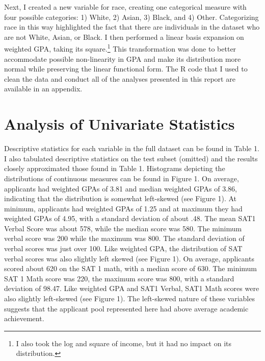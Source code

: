 \documentclass[titlepage]{article}   	%
\begin{document}
Next, I created a new variable for race, creating one categorical measure with four possible categories: 1) White, 2) Asian, 3) Black, and 4) Other. Categorizing race in this way highlighted the fact that there are individuals in the dataset who are not White, Asian, or Black. I then performed a linear basis expansion on weighted GPA, taking its square.\footnote{\label{myfootnote} I also took the log and square of income, but it had no impact on its distribution.} This transformation was done to better accommodate possible non-linearity in GPA and make its distribution more normal while preserving the linear functional form. The R code that I used to clean the data and conduct all of the analyses presented in this report are available in an appendix.

\section{Analysis of Univariate Statistics}

Descriptive statistics for each variable in the full dataset can be found in Table 1. I also tabulated descriptive statistics on the test subset (omitted) and the results closely approximated those found in Table 1. Histograms depicting the distributions of continuous measures can be found in Figure 1. On average, applicants had weighted GPAs of 3.81 and median weighted GPAs of 3.86, indicating that the distribution is somewhat left-skewed (see Figure 1). At minimum, applicants had weighted GPAs of 1.25 and at maximum they had weighted GPAs of 4.95, with a standard deviation of about .48.  The mean SAT1 Verbal Score was about 578, while the median score was 580. The minimum verbal score was 200 while the maximum was 800. The standard deviation of verbal scores was just over 100. Like weighted GPA, the distribution of SAT verbal scores was also slightly left skewed (see Figure 1). On average, applicants scored about 620 on the SAT 1 math, with a median score of 630. The minimum SAT 1 Math score was 220, the maximum score was 800, with a standard deviation of 98.47. Like weighted GPA and SAT1 Verbal, SAT1 Math scores were also slightly left-skewed (see Figure 1). The left-skewed nature of these variables suggests that the applicant pool represented here had above average academic achievement. 
\end{document}
